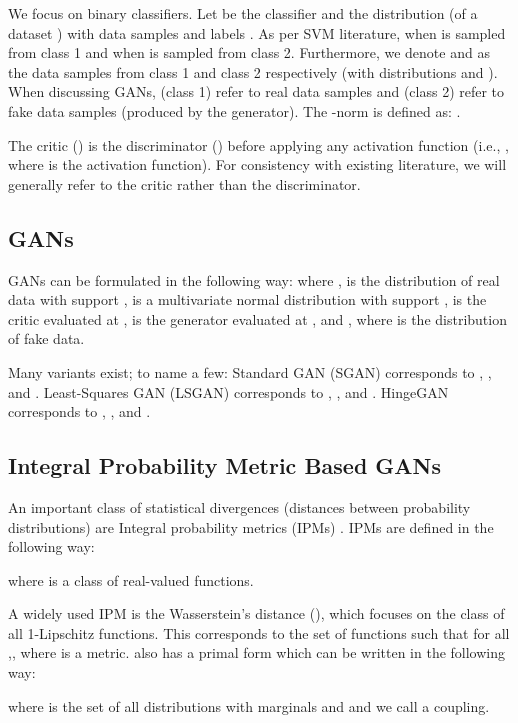 \documentclass{article}
\begin{document}
We focus on binary classifiers. Let  be the classifier and  the distribution (of a dataset ) with  data samples  and labels . As per SVM literature,  when  is sampled from class 1 and  when  is sampled from class 2. Furthermore, we denote  and  as the data samples from class 1 and class 2 respectively (with distributions  and ). When discussing GANs,  (class 1) refer to real data samples and  (class 2) refer to fake data samples (produced by the generator). The -norm is defined as: .

The critic () is the discriminator () before applying any activation function (i.e., , where  is the activation function).
For consistency with existing literature, we will generally refer to the critic rather than the discriminator.

\subsection{GANs}

GANs can be formulated in the following way:
\label{eqn:4}
where ,  is the distribution of real data with support ,   is a multivariate normal distribution with support ,  is the critic evaluated at ,  is the generator evaluated at , and , where  is the distribution of fake data. 

Many variants exist; to name a few: Standard GAN (SGAN) \citep{GAN} corresponds to , , and . Least-Squares GAN (LSGAN) \citep{LSGAN} corresponds to , , and . HingeGAN \citep{lim2017geometric} corresponds to , , and .


\subsection{Integral Probability Metric Based GANs}

An important class of statistical divergences (distances between probability distributions) are Integral probability metrics (IPMs) \citep{muller1997integral}. IPMs are defined in the following way:

where  is a class of real-valued functions.

A widely used IPM is the Wasserstein's distance (), which focuses on the class of all 1-Lipschitz functions. This corresponds to the set of functions  such that  for all ,, where  is a metric.  also has a primal form which can be written in the following way:

where  is the set of all distributions with marginals  and  and we call  a coupling.
\end{document}
